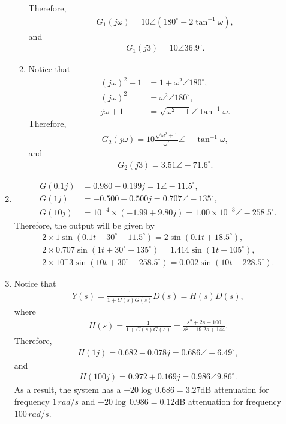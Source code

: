 \documentclass{article}
\begin{document}
\begin{enumerate}
\begin{enumerate}
    Therefore,
    \begin{align*}
     G_1(j\omega) = 10\angle (180^\circ -2\tan^{-1}\omega),
    \end{align*}
    and
    \begin{align*}
      G_1(j3) = 10\angle 36.9^\circ.
    \end{align*}
  \item Notice that
    \begin{align*}
      (j\omega)^2 -1 &= 1+\omega^2\angle 180^\circ,\\
      (j\omega)^2  &= \omega^2\angle 180^\circ,\\
      j\omega+1  &= \sqrt{\omega^2+1}\angle \tan^{-1}\omega.
    \end{align*}
    Therefore,
    \begin{align*}
      G_2(j\omega) = 10\frac{\sqrt{\omega^2+1}}{\omega^2}\angle -\tan^{-1}\omega,
    \end{align*}
    and
    \begin{align*}
      G_2(j3) = 3.51\angle -71.6^\circ.
    \end{align*}
  \end{enumerate}
\item 
  \begin{align*}
    G(0.1j)&=0.980-0.199j = 1\angle -11.5^\circ,\\
G(1j) &= -0.500-0.500j = 0.707\angle -135^\circ,\\
G(10j) &= 10^{-4}\times (-1.99+9.80j) = 1.00\times 10^{-3}\angle -258.5^\circ.
  \end{align*}
Therefore, the output will be given by
\begin{align*}
  2\times 1 \sin(0.1t +30^\circ - 11.5^\circ) = 2\sin(0.1t+18.5^\circ),\\
  2\times 0.707 \sin(1t +30^\circ - 135^\circ) = 1.414\sin(1t-105^\circ),\\
  2\times 10^-3 \sin(10t +30^\circ - 258.5^\circ) = 0.002\sin(10t-228.5^\circ).
\end{align*}
\item Notice that
\begin{align*}
  Y(s) = \frac{1}{1+C(s)G(s)}D(s) = H(s)D(s),
\end{align*}
where
\begin{align*}
  H(s) = \frac{1}{1+C(s)G(s)} = \frac{s^2+2s+100}{s^2+19.2s+144}.
\end{align*}
Therefore,
\begin{align*}
  H(1j) = 0.682-0.078j = 0.686\angle -6.49^\circ,
\end{align*}
and
\begin{align*}
  H(100j) = 0.972+0.169j = 0.986\angle 9.86^\circ.
\end{align*}
As a result, the system has a $-20\log\,0.686 = 3.27$dB attenuation for frequency $1\,rad/s$ and $-20\log\,0.986 = 0.12$dB attenuation for frequency $100\,rad/s$.




\end{enumerate}
\end{document}
